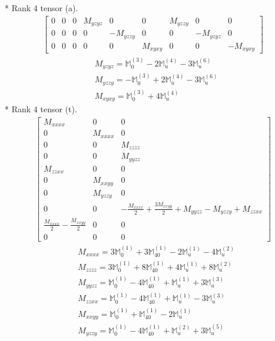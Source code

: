 \documentclass[fleqn,8pt,landscape]{jsarticle}
\begin{document}
* Rank 4 tensor (a).
\begin{align*}
\begin{bmatrix} 0 & 0 & 0 & M_{yzyz} & 0 & 0 & M_{yzzy} & 0 & 0 \\ 0 & 0 & 0 & 0 & - M_{yzzy} & 0 & 0 & - M_{yzyz} & 0 \\ 0 & 0 & 0 & 0 & 0 & M_{xyxy} & 0 & 0 & - M_{xyxy} \end{bmatrix}
\end{align*}
\begin{align*}
& M_{yzyz} = \mathbb{M}_{0}^{(3)} - 2 \mathbb{M}_{u}^{(4)} - 3 \mathbb{M}_{u}^{(6)} \\
& M_{yzzy} = - \mathbb{M}_{0}^{(3)} + 2 \mathbb{M}_{u}^{(4)} - 3 \mathbb{M}_{u}^{(6)} \\
& M_{xyxy} = \mathbb{M}_{0}^{(3)} + 4 \mathbb{M}_{u}^{(4)}
\end{align*}
* Rank 4 tensor (t).
\begin{align*}
\begin{bmatrix} M_{xxxx} & 0 & 0 \\ 0 & M_{xxxx} & 0 \\ 0 & 0 & M_{zzzz} \\ 0 & 0 & M_{yyzz} \\ M_{zzxx} & 0 & 0 \\ 0 & M_{xxyy} & 0 \\ 0 & M_{yzzy} & 0 \\ 0 & 0 & - \frac{M_{xxxx}}{2} + \frac{3 M_{xxyy}}{2} + M_{yyzz} - M_{yzzy} + M_{zzxx} \\ \frac{M_{xxxx}}{2} - \frac{M_{xxyy}}{2} & 0 & 0 \\ 0 & 0 & 0 \end{bmatrix}
\end{align*}
\begin{align*}
& M_{xxxx} = 3 \mathbb{M}_{0}^{(1)} + 3 \mathbb{M}_{40}^{(1)} - 2 \mathbb{M}_{u}^{(1)} - 4 \mathbb{M}_{u}^{(2)} \\
& M_{zzzz} = 3 \mathbb{M}_{0}^{(1)} + 8 \mathbb{M}_{40}^{(1)} + 4 \mathbb{M}_{u}^{(1)} + 8 \mathbb{M}_{u}^{(2)} \\
& M_{yyzz} = \mathbb{M}_{0}^{(1)} - 4 \mathbb{M}_{40}^{(1)} + \mathbb{M}_{u}^{(1)} + 3 \mathbb{M}_{u}^{(3)} \\
& M_{zzxx} = \mathbb{M}_{0}^{(1)} - 4 \mathbb{M}_{40}^{(1)} + \mathbb{M}_{u}^{(1)} - 3 \mathbb{M}_{u}^{(3)} \\
& M_{xxyy} = \mathbb{M}_{0}^{(1)} + \mathbb{M}_{40}^{(1)} - 2 \mathbb{M}_{u}^{(1)} \\
& M_{yzzy} = \mathbb{M}_{0}^{(1)} - 4 \mathbb{M}_{40}^{(1)} + \mathbb{M}_{u}^{(2)} + 3 \mathbb{M}_{u}^{(5)}
\end{align*}
\end{document}
